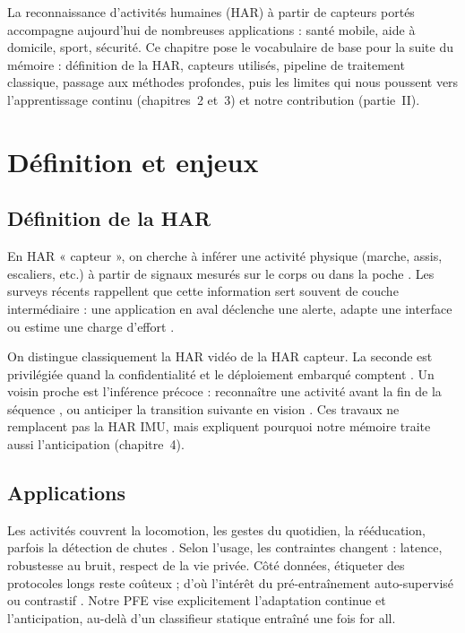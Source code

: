 \documentclass[a4paper,12pt]{report}
\begin{document}
La reconnaissance d'activités humaines (HAR) à partir de capteurs portés
accompagne aujourd'hui de nombreuses applications : santé mobile, aide à domicile,
sport, sécurité. Ce chapitre pose le vocabulaire de base pour la suite du mémoire :
définition de la HAR, capteurs utilisés, pipeline de traitement classique, passage
aux méthodes profondes, puis les limites qui nous poussent vers l'apprentissage
continu (chapitres~2 et~3) et notre contribution (partie~II).

\section{Définition et enjeux}

\subsection{Définition de la HAR}

En HAR « capteur », on cherche à inférer une activité physique (marche, assis,
escaliers, etc.) à partir de signaux mesurés sur le corps ou dans la poche
\parencite{bulling2014}. Les surveys récents rappellent que cette information sert
souvent de couche intermédiaire : une application en aval déclenche une alerte,
adapte une interface ou estime une charge d'effort \parencite{gu2021}.

On distingue classiquement la HAR vidéo de la HAR capteur. La seconde est
privilégiée quand la confidentialité et le déploiement embarqué comptent
\parencite{wang2019}. Un voisin proche est l'inférence précoce : reconnaître une
activité avant la fin de la séquence \parencite{ryoo2011}, ou anticiper la
transition suivante en vision \parencite{gammulle2019}. Ces travaux ne remplacent
pas la HAR IMU, mais expliquent pourquoi notre mémoire traite aussi
l'anticipation (chapitre~4).

\subsection{Applications}

Les activités couvrent la locomotion, les gestes du quotidien, la rééducation,
parfois la détection de chutes \parencite{gu2021,wang2019}. Selon l'usage, les
contraintes changent : latence, robustesse au bruit, respect de la vie privée.
Côté données, étiqueter des protocoles longs reste coûteux ; d'où l'intérêt du
pré-entraînement auto-supervisé ou contrastif
\parencite{yuan2024,tang2021}. Notre PFE vise explicitement l'adaptation
continue et l'anticipation, au-delà d'un classifieur statique entraîné une fois
for all.
\end{document}
